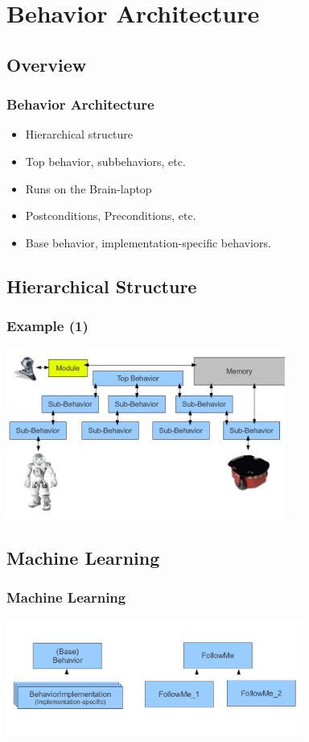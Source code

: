 \documentclass[]{beamer}
\begin{document}
\section{Behavior Architecture}

\subsection{Overview}
\begin{frame}
    \frametitle{Behavior Architecture}
    \begin{itemize}
        \item Hierarchical structure
        \item Top behavior, subbehaviors, etc.
        \item Runs on the Brain-laptop
        \item Postconditions, Preconditions, etc.
        \item Base behavior, implementation-specific behaviors.
    \end{itemize}
\end{frame}

\subsection{Hierarchical Structure}
\begin{frame}
    \frametitle{Example (1)}
    \begin{center}
        \includegraphics[height=2.2in]{img/behavior_structure_example.png}
    \end{center}
\end{frame}

\subsection{Machine Learning}
\begin{frame}
    \frametitle{Machine Learning}
    \begin{center}
        \includegraphics[height=1.5in]{img/behavior_base_implementation.png}
    \end{center}
\end{frame}
\end{document}
